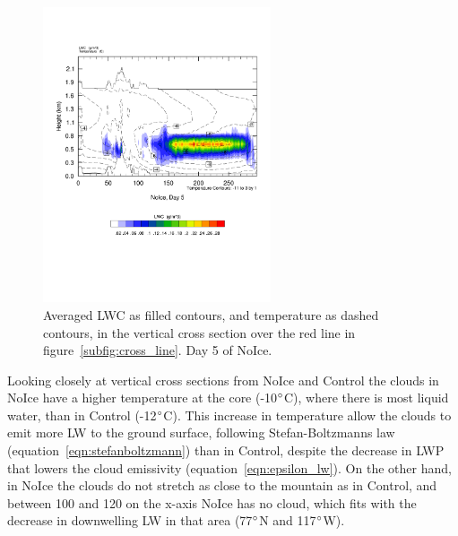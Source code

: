 \begin{figure}
\centering
\includegraphics[width=0.6\textwidth]{results/noice/crossSec_LWC_NoIce_Day5.pdf}
\caption{Averaged LWC as filled contours, and temperature as dashed contours, in the vertical cross section over the red line in figure~\ref{subfig:cross_line}. Day 5 of NoIce.}
\label{fig:cross_LWC_r2Day5}
\end{figure}

Looking closely at vertical cross sections from NoIce and Control the clouds in NoIce have a higher temperature at the core (-10$\degree$C), where there is most liquid water, than in Control (-12$\degree$C). This increase in temperature allow the clouds to emit more LW to the ground surface, following Stefan-Boltzmanns law (equation~\ref{eqn:stefanboltzmann}) than in Control, despite the decrease in LWP that lowers the cloud emissivity (equation~\ref{eqn:epsilon_lw}). On the other hand, in NoIce the clouds do not stretch as close to the mountain as in Control, and between 100 and 120 on the x-axis NoIce has no cloud, which fits with the decrease in downwelling LW in that area (77$\degree$N and 117$\degree$W).

